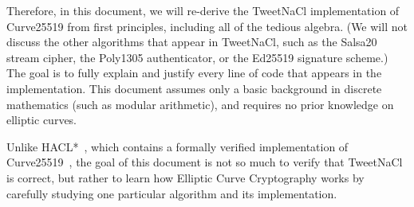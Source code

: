 \documentclass{article}
\begin{document}
Therefore, in this document, we will re-derive the TweetNaCl implementation of Curve25519 from first principles, including all of the tedious algebra.
(We will not discuss the other algorithms that appear in TweetNaCl, such as the Salsa20 stream cipher, the Poly1305 authenticator, or the Ed25519 signature scheme.)
The goal is to fully explain and justify every line of code that appears in the implementation.
This document assumes only a basic background in discrete mathematics (such as modular arithmetic), and requires no prior knowledge on elliptic curves.

Unlike HACL*~\cite{HACLStar}, which contains a formally verified implementation of Curve25519~\cite{Zinzindohoue:2017fc}, the goal of this document is not so much to verify that TweetNaCl is correct, but rather to learn how Elliptic Curve Cryptography works by carefully studying one particular algorithm and its implementation.



\end{document}
